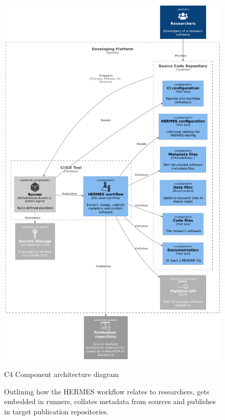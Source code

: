 \documentclass[11pt,a4paper]{scrartcl}
\begin{document}

\clearpage


\clearpage

\begin{figure}[htp]
    \centering
    \includegraphics[height=0.9\textheight]{images/architecture/HERMES_System.pdf}
    
    \caption{C4 Component architecture diagram}
    \caption*{Outlining how the HERMES workflow relates to researchers, gets embedded in runners, collates metadata from sources and publishes in target publication repositories.}
    \label{fig:hermes-architecture}
\end{figure}
\end{document}

